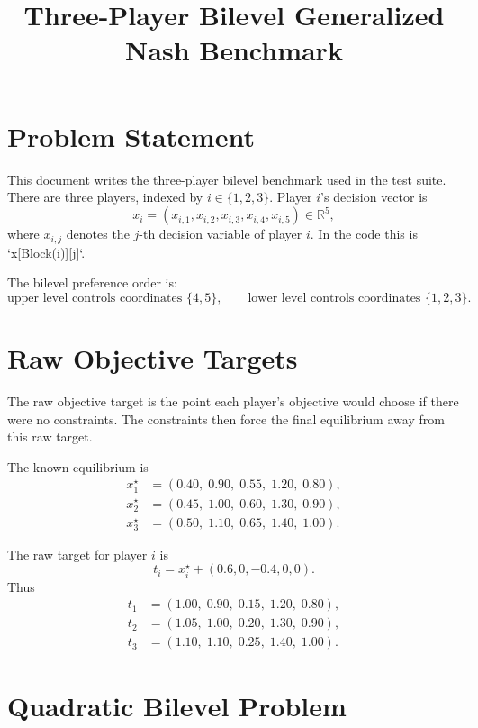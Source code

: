 \documentclass[11pt]{article}
\title{Three-Player Bilevel Generalized Nash Benchmark}
\author{}
\date{}
\begin{document}
\maketitle

\section*{Problem Statement}

This document writes the three-player bilevel benchmark used in the test suite.
There are three players, indexed by \(i \in \{1,2,3\}\). Player \(i\)'s
decision vector is
\[
  x_i = (x_{i,1},x_{i,2},x_{i,3},x_{i,4},x_{i,5}) \in \mathbb{R}^5,
\]
where \(x_{i,j}\) denotes the \(j\)-th decision variable of player \(i\). In the
code this is `x[Block(i)][j]`.

The bilevel preference order is:
\[
  \text{upper level controls coordinates } \{4,5\}, \qquad
  \text{lower level controls coordinates } \{1,2,3\}.
\]

\section*{Raw Objective Targets}

The raw objective target is the point each player's objective would choose if
there were no constraints. The constraints then force the final equilibrium away
from this raw target.

The known equilibrium is
\[
\begin{aligned}
  x_1^\star &= (0.40,\;0.90,\;0.55,\;1.20,\;0.80),\\
  x_2^\star &= (0.45,\;1.00,\;0.60,\;1.30,\;0.90),\\
  x_3^\star &= (0.50,\;1.10,\;0.65,\;1.40,\;1.00).
\end{aligned}
\]

The raw target for player \(i\) is
\[
  t_i = x_i^\star + (0.6,0,-0.4,0,0).
\]
Thus
\[
\begin{aligned}
  t_1 &= (1.00,\;0.90,\;0.15,\;1.20,\;0.80),\\
  t_2 &= (1.05,\;1.00,\;0.20,\;1.30,\;0.90),\\
  t_3 &= (1.10,\;1.10,\;0.25,\;1.40,\;1.00).
\end{aligned}
\]

\section*{Quadratic Bilevel Problem}
\end{document}
